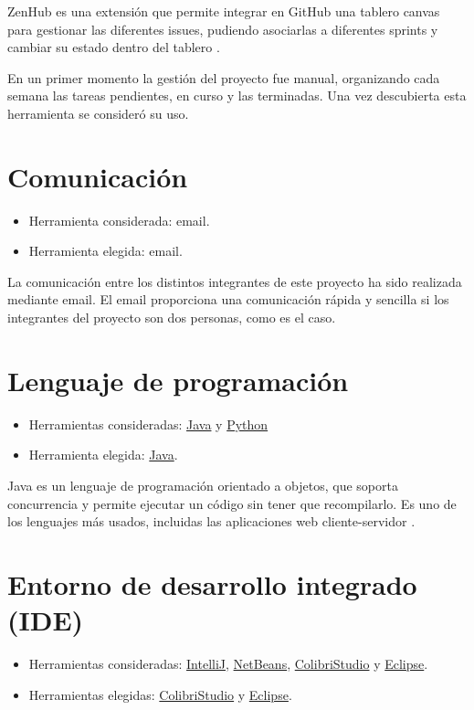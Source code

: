 ZenHub es una extensión que permite integrar en GitHub una tablero canvas para gestionar las diferentes issues, pudiendo asociarlas a diferentes sprints y cambiar su estado dentro del tablero \cite{zenhub:info}.

En un primer momento la gestión del proyecto fue manual, organizando cada semana las tareas pendientes, en curso y las terminadas. Una vez descubierta esta herramienta se consideró su uso.


\section{Comunicación}

\begin{itemize}
\tightlist
\item
  Herramienta considerada: email.
\item
  Herramienta elegida: email.
\end{itemize}

La comunicación entre los distintos integrantes de este proyecto ha sido realizada mediante email. El email proporciona una comunicación rápida y sencilla si los integrantes del proyecto son dos personas, como es el caso.

\section{Lenguaje de programación}
\begin{itemize}
\tightlist
\item
  Herramientas consideradas: \href{https://www.java.com/es/download/}{Java} y \href{https://www.python.org/}{Python}
\item
  Herramienta elegida: \href{https://www.java.com/es/download/}{Java}.
\end{itemize}

Java es un lenguaje de programación orientado a objetos, que soporta concurrencia y permite ejecutar un código sin tener que recompilarlo. Es uno de los lenguajes más usados, incluidas las aplicaciones web cliente-servidor \cite{java:wiki}.

\section{Entorno de desarrollo integrado (IDE)}

\begin{itemize}
\tightlist
\item
  Herramientas consideradas: \href{https://www.jetbrains.com/idea/}{IntelliJ}, \href{https://netbeans.org/}{NetBeans}, \href{http://gaia.fdi.ucm.es/research/colibri/colibristudio}{ColibriStudio} y \href{https://eclipse.org/}{Eclipse}.
\item
  Herramientas elegidas: \href{http://gaia.fdi.ucm.es/research/colibri/colibristudio}{ColibriStudio} y \href{https://eclipse.org/}{Eclipse}.
\end{itemize}

